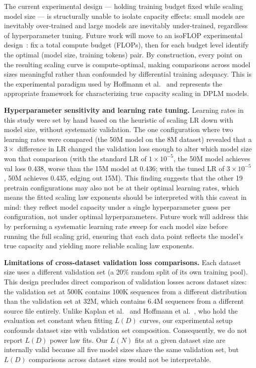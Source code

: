 \documentclass[12pt]{article}
\begin{document}
The current experimental design — holding training budget fixed while scaling model size —
is structurally unable to isolate capacity effects: small models are inevitably over-trained
and large models are inevitably under-trained, regardless of hyperparameter tuning. Future
work will move to an isoFLOP experimental design~\cite{hoffmann2022}: fix a total compute
budget (FLOPs), then for each budget level identify the optimal (model size, training tokens)
pair. By construction, every point on the resulting scaling curve is compute-optimal, making
comparisons across model sizes meaningful rather than confounded by differential training
adequacy. This is the experimental paradigm used by Hoffmann et al.~\cite{hoffmann2022} and
represents the appropriate framework for characterizing true capacity scaling in DPLM models.

\textbf{Hyperparameter sensitivity and learning rate tuning.}
Learning rates in this study were set by hand based on the heuristic of scaling LR down with
model size, without systematic validation. The one configuration where two learning rates were
compared (the 50M model on the 8M dataset) revealed that a $3\times$ difference in LR
changed the validation loss enough to alter which model size won that comparison (with the
standard LR of $1\times10^{-5}$, the 50M model achieves val loss 0.438, worse than the 15M
model at 0.436; with the tuned LR of $3\times10^{-5}$, 50M achieves 0.435, edging out 15M).
This finding suggests that the other 19 pretrain configurations may also not be at their
optimal learning rates, which means the fitted scaling law exponents should be interpreted
with this caveat in mind: they reflect model capacity under a single hyperparameter guess
per configuration, not under optimal hyperparameters. Future work will address this by
performing a systematic learning rate sweep for each model size before running the full
scaling grid, ensuring that each data point reflects the model's true capacity and yielding
more reliable scaling law exponents.

\textbf{Limitations of cross-dataset validation loss comparisons.}
Each dataset size uses a different validation set (a 20\% random split of its own training
pool). This design precludes direct comparison of validation losses across dataset sizes: the
validation set at 500K contains 100K sequences from a different distribution than the
validation set at 32M, which contains 6.4M sequences from a different source file entirely.
Unlike Kaplan et al.~\cite{kaplan2020} and Hoffmann et al.~\cite{hoffmann2022}, who hold the
evaluation set constant when fitting $L(D)$ curves, our experimental setup confounds
dataset size with validation set composition. Consequently, we do not report $L(D)$ power
law fits. Our $L(N)$ fits at a given dataset size are internally valid because all five
model sizes share the same validation set, but $L(D)$ comparisons across dataset sizes would
not be interpretable.
\end{document}
